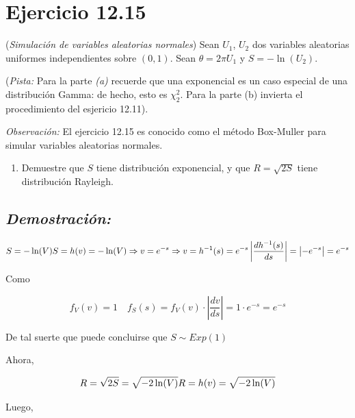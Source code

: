 \documentclass[]{article}
\providecommand{\tightlist}{%
  \setlength{\itemsep}{0pt}\setlength{\parskip}{0pt}}
\begin{document}
\section{Ejercicio 12.15}\label{ejercicio-12.15}

(\emph{Simulación de variables aleatorias normales}) Sean \(U_1\),
\(U_2\) dos variables aleatorias uniformes independientes sobre
\((0,1)\). Sean \(\theta=2\pi U_1\) y \(S=-\ln(U_2)\).

(\emph{Pista:} Para la parte \emph{(a)} recuerde que una exponencial es
un caso especial de una distribución Gamma: de hecho, esto es
\(\chi_2^2\). Para la parte (b) invierta el procedimiento del esjericio
12.11).

\emph{Observación:} El ejercicio 12.15 es conocido como el método
Box-Muller para simular variables aleatorias normales.

\begin{enumerate}
\def\labelenumi{\alph{enumi}.}
\tightlist
\item
  Demuestre que \(S\) tiene distribución exponencial, y que
  \(R =\sqrt{2S}\) tiene distribución Rayleigh.
\end{enumerate}

\subsection{\texorpdfstring{\emph{Demostración:}}{Demostración:}}\label{demostracion-2}

\begin{equation}
S=-\ln(V)\\
S=h(v)=-\ln(V)\Rightarrow v=e^{-s} \Rightarrow v=h^{-1}(s)=e^{-s}\\
\left| \frac{dh^{-1}(s)}{ds}  \right|=\left| -e^{-s}  \right|=e^{-s}
\end{equation}

Como

\begin{equation}
f_V(v)=1 \quad f_S(s)=f_V(v)\cdot \left| \frac{dv}{ds}  \right|=1\cdot e^{-s}=e^{-s}
\end{equation}

De tal suerte que puede concluirse que \(S \sim Exp(1)\)

Ahora,

\begin{equation}
R=\sqrt{2S}=\sqrt{-2\ln(V)}\\
R=h(v)=\sqrt{-2\ln(V)}
\end{equation}

Luego,
\end{document}
